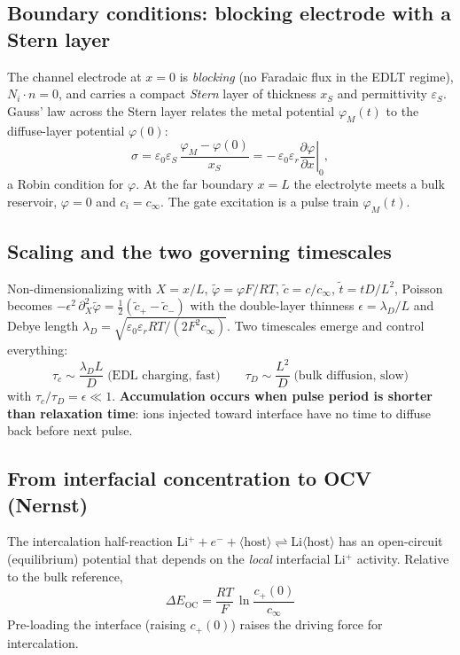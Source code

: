 \documentclass[11pt,a4paper]{article}
\newcommand{\Lip}{\ensuremath{\mathrm{Li^{+}}}}
\newcommand{\cinf}{\ensuremath{c_{\infty}}}
\newcommand{\cs}{\ensuremath{c_{+}(0)}}
\begin{document}
\subsection{Boundary conditions: blocking electrode with a Stern layer}
The channel electrode at $x=0$ is \emph{blocking} (no Faradaic flux in the EDLT
regime), $N_i\!\cdot\!n=0$, and carries a compact \emph{Stern} layer of
thickness $x_S$ and permittivity $\varepsilon_S$. Gauss' law across the Stern
layer relates the metal potential $\varphi_M(t)$ to the diffuse-layer potential
$\varphi(0)$:
\begin{equation}
\sigma = \varepsilon_0\varepsilon_S\,\frac{\varphi_M-\varphi(0)}{x_S}
       = -\,\varepsilon_0\varepsilon_r\left.\frac{\partial\varphi}{\partial x}\right|_{0},
\label{eq:stern}
\end{equation}
a Robin condition for $\varphi$. At the far boundary $x=L$ the electrolyte meets
a bulk reservoir, $\varphi=0$ and $c_i=\cinf$. The gate excitation is a pulse
train $\varphi_M(t)$.

\subsection{Scaling and the two governing timescales}
Non-dimensionalizing with $X=x/L$, $\tilde\varphi=\varphi F/RT$,
$\tilde c=c/\cinf$, $\tilde t=tD/L^2$, Poisson becomes
$-\epsilon^2\,\partial_X^2\tilde\varphi=\tfrac12(\tilde c_+-\tilde c_-)$ with the
double-layer thinness $\epsilon=\lambda_D/L$ and Debye length
$\lambda_D=\sqrt{\varepsilon_0\varepsilon_r RT/(2F^2\cinf)}$. Two timescales
emerge and control everything:
\begin{equation}
\boxed{\;\tau_c \sim \frac{\lambda_D L}{D}\;\text{(EDL charging, fast)}\qquad
        \tau_D \sim \frac{L^2}{D}\;\text{(bulk diffusion, slow)}\;}
\label{eq:tau}
\end{equation}
with $\tau_c/\tau_D=\epsilon\ll1$. \textbf{Accumulation occurs when pulse
period is shorter than relaxation time}: ions injected toward interface
have no time to diffuse back before next pulse.

\subsection{From interfacial concentration to OCV (Nernst)}
The intercalation half-reaction
$\Lip + e^- + \langle\text{host}\rangle \rightleftharpoons \mathrm{Li}\langle\text{host}\rangle$
has an open-circuit (equilibrium) potential that depends on the \emph{local}
interfacial \Lip{} activity. Relative to the bulk reference,
\begin{equation}
\Delta E_{\mathrm{OC}} = \frac{RT}{F}\,\ln\!\frac{\cs}{\cinf}
\label{eq:nernst}
\end{equation}
Pre-loading the interface (raising $\cs$) raises the driving force for
intercalation.
\end{document}

